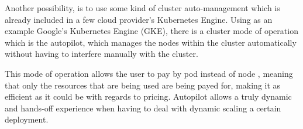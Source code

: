 Another possibility, is to use some kind of cluster auto-management which is already included in a few cloud provider's Kubernetes Engine. Using as an example Google's Kubernetes Engine (GKE), there is a cluster mode of operation which is the autopilot, which manages the nodes within the cluster automatically without having to interfere manually with the cluster.

This mode of operation allows the user to pay by pod instead of node \cite{GKEautopilot}, meaning that only the resources that are being used are being payed for, making it as efficient as it could be with regards to pricing. Autopilot allows a truly dynamic and hands-off experience when having to deal with dynamic scaling a certain deployment.


\begin{comment}

    \subsection{Deploying Containerized Applications on AWS}
    
    There are several possibilities to deploy a container in a cloud service provider. One of the options, is the native Elastic Container Service which is a powerful tool to easily deploy, manage and scale containerized applications, which also supports Docker containers. 
    
    Some important concepts are \cite{AmazonECSdocs}:
    \begin{itemize}
        \item task definition - Required to run Docker containers on ECS, this defines how the containers defined should run in its environment. Parameters defined in this file are: container image, CPU and memory to use with each task, networking, and others;
        \item tasks - instances of a task definition;
        \item services - Defines a state for a specified number of tasks. When a given task fails, then the service attempts to create a new task to maintain as many healthy tasks as specified in the service;
        \item cluster - A logical grouping of tasks and services. These two entities run on machines that are registered to the cluster.
    \end{itemize}
    
    This service also provides cluster autoscaling based on cluster usage.
    

\end{comment}
